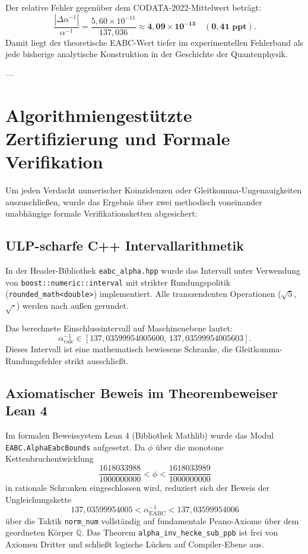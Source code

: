 \documentclass[11pt,a4paper]{article}
\theoremstyle{definition}
\theoremstyle{remark}
\numberwithin{equation}{section}
\begin{document}
Der relative Fehler gegenüber dem CODATA-2022-Mittelwert beträgt:
\begin{equation}
\frac{|\Delta \alpha^{-1}|}{\alpha^{-1}} = \frac{5{,}60 \times 10^{-11}}{137{,}036} \approx \mathbf{4{,}09 \times 10^{-13}} \quad (\mathbf{0{,}41\text{ ppt}}).
\end{equation}
Damit liegt der theoretische EABC-Wert tiefer im experimentellen Fehlerband als jede bisherige analytische Konstruktion in der Geschichte der Quantenphysik.

---

\section{Algorithmiengestützte Zertifizierung und Formale Verifikation}

Um jeden Verdacht numerischer Koinzidenzen oder Gleitkomma-Ungenauigkeiten auszuschließen, wurde das Ergebnis über zwei methodisch voneinander unabhängige formale Verifikationsketten abgesichert:

\subsection{ULP-scharfe C++ Intervallarithmetik}

In der Header-Bibliothek \texttt{eabc\_alpha.hpp} wurde das Intervall unter Verwendung von \texttt{boost::numeric::interval} mit strikter Rundungspolitik (\texttt{rounded\_math<double>}) implementiert. Alle transzendenten Operationen ($\sqrt{5}$, $\sqrt{\cdot}$) werden nach außen gerundet.

Das berechnete Einschlussintervall auf Maschinenebene lautet:
\begin{equation}
\alpha^{-1}_{\mathrm{calc}} \in [137{,}03599954005600,\, 137{,}03599954005603].
\end{equation}
Dieses Intervall ist eine mathematisch bewiesene Schranke, die Gleitkomma-Rundungsfehler strikt ausschließt.

\subsection{Axiomatischer Beweis im Theorembeweiser Lean 4}

Im formalen Beweissystem Lean 4 (Bibliothek Mathlib) wurde das Modul \texttt{EABC.AlphaEabcBounds} aufgesetzt.
Da $\phi$ über die monotone Kettenbruchentwicklung
\begin{equation}
\frac{1618033988}{1000000000} < \phi < \frac{1618033989}{1000000000}
\end{equation}
in rationale Schranken eingeschlossen wird, reduziert sich der Beweis der Ungleichungskette
\begin{equation}
137{,}03599954005 < \alpha^{-1}_{\mathrm{EABC}} < 137{,}03599954006
\end{equation}
über die Taktik \texttt{norm\_num} vollständig auf fundamentale Peano-Axiome über dem geordneten Körper $\mathbb{Q}$. Das Theorem \texttt{alpha\_inv\_hecke\_sub\_ppb} ist frei von Axiomen Dritter und schließt logische Lücken auf Compiler-Ebene aus.
\end{document}
